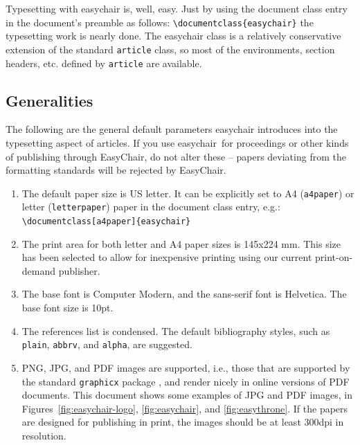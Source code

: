 \documentclass[]{easychair}
\newcommand{\easychair}{\textsf{easychair}}
\begin{document}
Typesetting with {\easychair} is, well, easy.  Just by using the
document class entry in the document's preamble as follows:
\verb+\documentclass{easychair}+ the typesetting work is nearly done.
The {\easychair} class is a relatively conservative extension of the
standard \texttt{article} class, so most of the environments, section
headers, etc. defined by \texttt{article} are available.

\subsection{Generalities}
\label{sect:generalities}

The following are the general default parameters {\easychair}
introduces into the typesetting aspect of articles. If you use
\easychair\ for proceedings or other kinds of publishing through
EasyChair, do not alter these -- papers deviating from the formatting
standards will be rejected by EasyChair.

\begin{enumerate}
\item
The default paper size is US letter. It can be explicitly set to A4 
(\texttt{a4paper}) or letter (\texttt{letterpaper}) paper in the
document class entry, e.g.:\\\verb+\documentclass[a4paper]{easychair}+

\item
The print area for both letter and A4 paper sizes is 145x224 mm. This size
has been selected to allow for inexpensive printing using our current
print-on-demand publisher.

\item
The base font is Computer Modern, and the {\sf sans-serif} font is
{\sf Helvetica}. The base font size is 10pt. 

\item
The references list is condensed. The default bibliography styles, such as
\texttt{plain}, \texttt{abbrv}, and \texttt{alpha}, are suggested.

\item
PNG, JPG, and PDF images are supported, i.e., those that are supported
by the standard \texttt{graphicx} package \cite{graphicx-package}, and
render nicely in online versions of PDF documents.  This document
shows some examples of JPG and PDF images, in
Figures~\ref{fig:easychair-logo}, \ref{fig:easychair}, and
\ref{fig:easythrone}. If the papers are designed for publishing in
print, the images should be at least 300dpi in resolution.

\end{enumerate}
\end{document}
